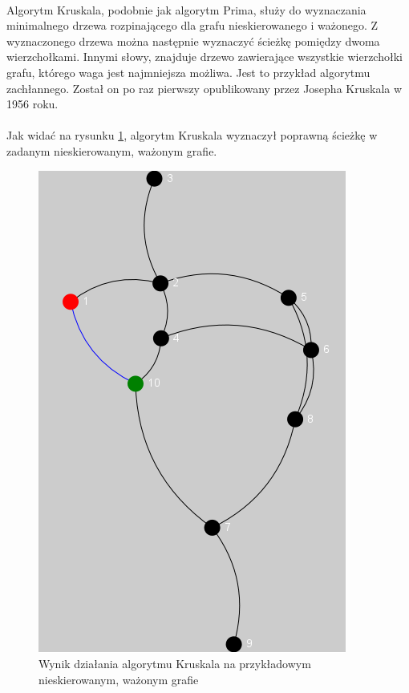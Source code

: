 \paragraph{}
Algorytm Kruskala, podobnie jak algorytm Prima, służy do wyznaczania minimalnego drzewa rozpinającego dla grafu nieskierowanego i ważonego. 
Z wyznaczonego drzewa można następnie wyznaczyć ścieżkę pomiędzy dwoma wierzchołkami.
Innymi słowy, znajduje drzewo zawierające wszystkie wierzchołki grafu, którego waga jest najmniejsza możliwa. 
Jest to przykład algorytmu zachłannego.
Został on po raz pierwszy opublikowany przez Josepha Kruskala w 1956 roku.

\paragraph{}
Jak widać na rysunku \ref{fig:kruskal}, algorytm Kruskala wyznaczył poprawną ścieżkę w zadanym nieskierowanym, ważonym grafie.
\begin{figure}[!h]
 \centering
 \includegraphics{algorithms/kruskal}
 \caption{Wynik działania algorytmu Kruskala na przykładowym nieskierowanym, ważonym grafie}
 \label{fig:kruskal}
\end{figure}

